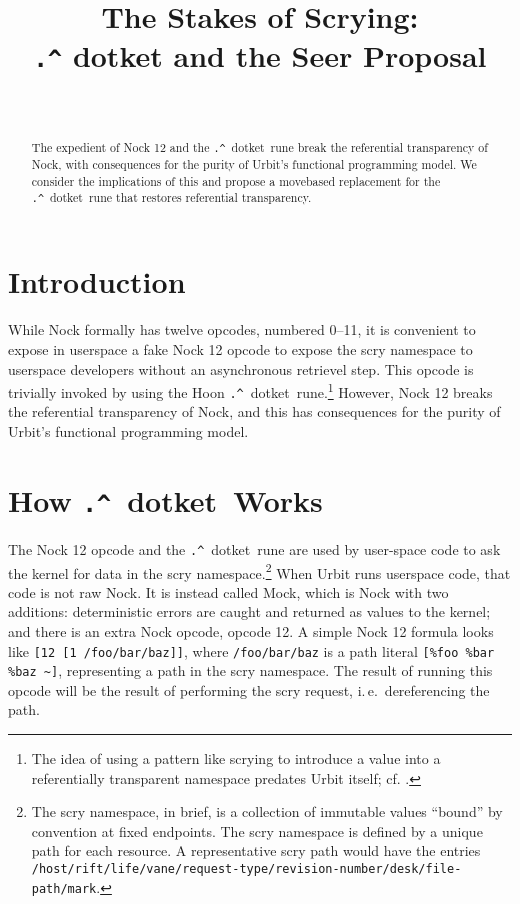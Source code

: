 \documentclass[twoside]{article}
\title{The Stakes of Scrying:  \\ \lstinline[style=inlinecode]{.^} dotket and the Seer Proposal}
\author{\authorname~\authorpatp \\ \affiliation}
\date{}
\newcommand{\dotket}{\lstinline[style=inlinecode]{.^}~dotket}
\begin{document}
\maketitle
\thispagestyle{firststyle}

\begin{abstract}
\noindent
The expedient of Nock 12 and the \dotket~rune break the referential transparency of Nock, with consequences for the purity of Urbit's functional programming model.  We consider the implications of this and propose a move\-based replacement for the \dotket~rune that restores referential transparency.
\end{abstract}

\setcounter{page}{47}

\tableofcontents

\section{Introduction}

While Nock formally has twelve opcodes, numbered 0--11, it is convenient to expose in userspace a fake Nock 12 opcode to expose the scry namespace to userspace developers without an asynchronous retrievel step.  This opcode is trivially invoked by using the Hoon \dotket~rune.\footnote{The idea of using a pattern like scrying to introduce a value into a referentially transparent namespace predates Urbit itself; cf. \citet{Yarvin2006}.}  However, Nock 12 breaks the referential transparency of Nock, and this has consequences for the purity of Urbit's functional programming model.

\section{How \dotket~Works}

The Nock 12 opcode and the \dotket~rune are used by user-\newline{}space code to ask the kernel for data in the scry namespace.\footnote{The scry namespace, in brief, is a collection of immutable values “bound” by convention at fixed endpoints.  The scry namespace is defined by a unique path for each resource.  A representative scry path would have the entries \texttt{/host/rift/life/vane/request-type/revision-number/desk\newline{}/file-path/mark}.}  When Urbit runs userspace code, that code is not raw Nock.  It is instead called Mock, which is Nock with two additions:   deterministic errors are caught and returned as values to the kernel; and there is an extra Nock opcode, opcode 12.  A simple Nock 12 formula looks like \lstinline[style=inlinecode]{[12 [1 /foo/bar/baz]]}, where \lstinline[style=inlinecode]{/foo/bar/baz} is a path literal \lstinline[style=inlinecode]{[%foo %bar %baz ~]}, representing a path in the scry namespace.  The result of running this opcode will be the result of performing the scry request, i.\,e.\ dereferencing the path.
\end{document}
